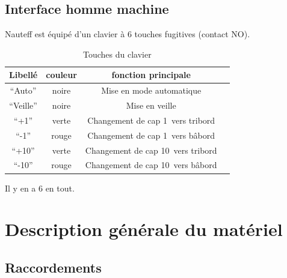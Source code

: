\documentclass[a4paper,11pt]{report}
\begin{document}
\section{Interface homme machine}
Nauteff est équipé d'un clavier à 6 touches fugitives (contact NO).

\begin{table}
\begin{tabular}{|c|c|c|c|}
	\hline 
	Libellé    & couleur & fonction principale &  \\ 
	\hline 
	``Auto''   & noire & Mise en mode automatique &  \\ 
	\hline 
	``Veille'' & noire & Mise en veille &  \\ 
	\hline 
	``+1''     & verte & Changement de cap 1\degres~vers tribord &  \\ 
	\hline 
	``-1''     & rouge & Changement de cap 1\degres~vers bâbord  &  \\ 
	\hline 
	``+10''    & verte & Changement de cap 10\degres~vers tribord &  \\ 
	\hline 
	``-10''    & rouge & Changement de cap 10\degres~vers bâbord  &  \\ 
	\hline
\end{tabular} 
\caption{Touches du clavier}
\end{table}
Il y en a 6 en tout.

\chapter{Description générale du matériel}

\section{Raccordements}
\end{document}
